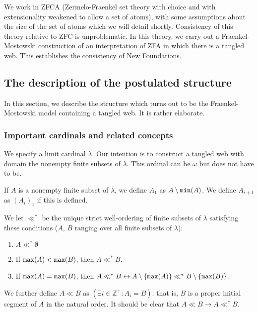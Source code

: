 \documentclass[12pt]{article}
\begin{document}
We work in ZFCA (Zermelo-Fraenkel set theory with choice and with extensionality weakened to allow a set of atoms), with some assumptions about the size of the set of atoms which we will detail
shortly.  Consistency of this theory relative to ZFC is unproblematic.  In this theory, we carry out a Fraenkel-Mostowski construction of an interpretation of ZFA in which there is a tangled web.  This establishes the consistency of New Foundations.

\subsection{The description of the postulated structure}

In this section, we describe the structure which turns out to be the Fraenkel-Mostowski model containing a tangled web.  It is rather elaborate.

\newpage

\subsubsection{Important cardinals and related concepts}

We specify a limit cardinal $\lambda$.  Our intention is to construct a tangled web with domain the nonempty finite subsets of $\lambda$.  This ordinal can be $\omega$ but does not have to be.

If $A$ is a nonempty finite subset of $\lambda$, we define $A_1$ as $A \setminus {\tt min}(A)$.  We define $A_{i+1}$ as $(A_i)_1$ if this is defined.

We let $\ll^*$ be the unique strict well-ordering of finite subsets of $\lambda$ satisfying these conditions ($A$, $B$ ranging over all finite subsets of $\lambda$):

\begin{enumerate}

\item  $A \ll^* \emptyset$

\item  If ${\tt max}(A) < {\tt max}(B)$, then $A \ll^* B$.

\item  If ${\tt max}(A) = {\tt max}(B)$, then $A \ll^* B \leftrightarrow A \setminus \{{\tt max}(A)\} \ll^* B \setminus \{{\tt max}(B)\}$.

\end{enumerate}

We further define $A \ll B$ as $(\exists i \in {\mathbb Z}^+:A_i = B)$:  that is, $B$ is a proper initial segment of $A$ in the natural order.  It should be clear
that $A \ll B \rightarrow A \ll^* B$.
\end{document}
